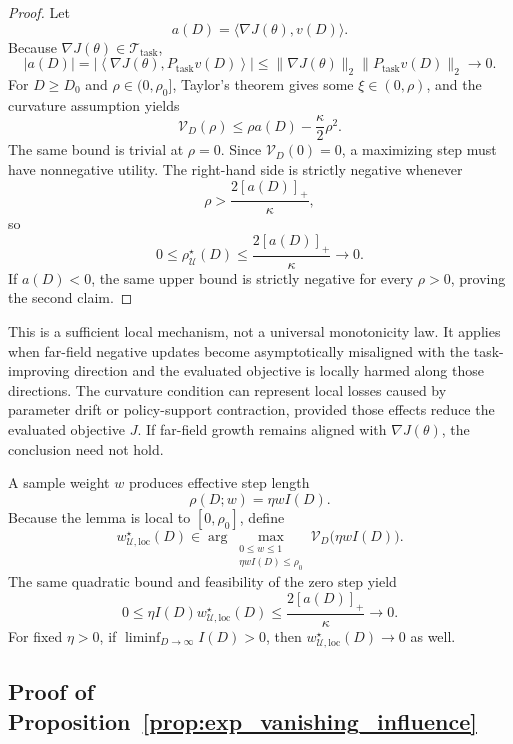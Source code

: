 \documentclass{article}
\theoremstyle{plain}
\theoremstyle{definition}
\theoremstyle{remark}
\begin{document}
\begin{proof}
Let
\[
a(D)
=
\langle\nabla J(\theta),v(D)\rangle.
\]
Because
\(\nabla J(\theta)\in\mathcal T_{\mathrm{task}}\),
\[
|a(D)|
=
\left|
\left\langle
\nabla J(\theta),
P_{\mathrm{task}}v(D)
\right\rangle
\right|
\le
\|\nabla J(\theta)\|_2
\|P_{\mathrm{task}}v(D)\|_2
\longrightarrow0.
\]
For \(D\ge D_0\) and \(\rho\in(0,\rho_0]\), Taylor's theorem gives some
\(\xi\in(0,\rho)\), and the curvature assumption yields
\[
\mathcal V_D(\rho)
\le
\rho a(D)-\frac{\kappa}{2}\rho^2.
\]
The same bound is trivial at \(\rho=0\). Since
\(\mathcal V_D(0)=0\), a maximizing step must have nonnegative utility.
The right-hand side is strictly negative whenever
\[
\rho
>
\frac{2[a(D)]_+}{\kappa},
\]
so
\[
0
\le
\rho_{\mathcal U}^\star(D)
\le
\frac{2[a(D)]_+}{\kappa}
\longrightarrow0.
\]
If \(a(D)<0\), the same upper bound is strictly negative for every
\(\rho>0\), proving the second claim.
\end{proof}

This is a sufficient local mechanism, not a universal monotonicity law.
It applies when far-field negative updates become asymptotically
misaligned with the task-improving direction and the evaluated objective
is locally harmed along those directions. The curvature condition can
represent local losses caused by parameter drift or policy-support
contraction, provided those effects reduce the evaluated objective
\(J\). If far-field growth remains aligned with \(\nabla J(\theta)\),
the conclusion need not hold.

A sample weight \(w\) produces effective step length
\[
\rho(D;w)
=
\eta w I(D).
\]
Because the lemma is local to \([0,\rho_0]\), define
\[
w_{\mathcal U,\mathrm{loc}}^\star(D)
\in
\arg\max_{\substack{0\le w\le1\\ \eta wI(D)\le\rho_0}}
\mathcal V_D\bigl(\eta wI(D)\bigr).
\]
The same quadratic bound and feasibility of the zero step yield
\[
0
\le
\eta I(D)w_{\mathcal U,\mathrm{loc}}^\star(D)
\le
\frac{2[a(D)]_+}{\kappa}
\longrightarrow0.
\]
For fixed \(\eta>0\), if
\(\liminf_{D\to\infty}I(D)>0\), then
\(w_{\mathcal U,\mathrm{loc}}^\star(D)\to0\) as well.

\subsection{Proof of Proposition~\ref{prop:exp_vanishing_influence}}
\label{app:exp_vanishing_influence}
\end{document}
